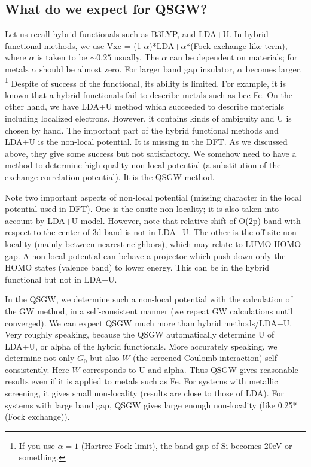 \documentclass[a4paper,10pt,epsf,fleqn]{article}
\begin{document}
\subsection{What do we expect for QSGW?}
Let us recall hybrid functionals such as B3LYP, and LDA+U.
In hybrid functional methods, 
we use Vxc = (1-$\alpha$)*LDA+$\alpha$*(Fock exchange like term),
where $\alpha$ is taken to be $\sim0.25$ usually. 
The $\alpha$ can be dependent on materials; for metals $\alpha$ should be
almost zero. For larger band gap insulator, $\alpha$ becomes larger.
\footnote{If you use $\alpha=1$ (Hartree-Fock limit), 
the band gap of Si becomes 20eV or something.}
Despite of success of the functional, its ability is limited.
For example, it is known that a hybrid functionals fail to describe 
metals such as bcc Fe. 
On the other hand, we have LDA+U method which succeeded to describe
materials including localized electrons. However, it contains kinds of
ambiguity and U is chosen by hand.
The important part of the hybrid functional methods and LDA+U
is the non-local potential. It is missing in the DFT.
As we discussed above, they give some success but not satisfactory.
We somehow need to have a method to determine high-quality
non-local potential (a substitution of the exchange-correlation potential).
It is the QSGW method.

Note two important aspects of non-local potential (missing character 
in the local potential used in DFT). 
One is the onsite non-locality; it is also taken into account by LDA+U
model. However, note that relative shift of O(2p) band with respect
to the center of 3d band is not in LDA+U.
The other is the off-site non-locality (mainly between nearest neighbors),
which may relate to LUMO-HOMO gap. A non-local potential can behave a
projector which push down only the HOMO states (valence band) to lower energy.
This can be in the hybrid functional but not in LDA+U. 

In the QSGW, we determine such a non-local potential with the calculation of the 
GW method, in a self-consistent manner (we repeat GW calculations
until converged). We can expect QSGW much more than hybrid methods/LDA+U.
Very roughly speaking, because the QSGW automatically determine 
U of LDA+U, or alpha of the hybrid functionals. More accurately speaking,
we determine not only $G_0$ but also $W$  (the screened Coulomb
interaction) self-consistently. Here $W$ corresponds to U and alpha.
Thus QSGW gives reasonable results even if it is applied to metals such
as Fe. For systems with metallic screening, it gives small non-locality
(results are close to those of LDA). For systems with large band gap,
QSGW gives large enough non-locality (like 0.25*(Fock exchange)).
\end{document}
